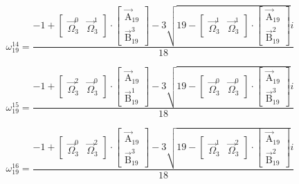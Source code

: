 \documentclass{article}
\begin{document}
\[ \omega_{19}^{14}=\frac{-1+\left[ \begin{matrix} \vec{\Omega}_{3}^{0} & \vec{\Omega}_{3}^{1} \end{matrix} \right]\cdot\left[ \begin{matrix} \vec{\mathrm{A}}_{19} \\ \vec{\mathrm{B}}_{19}^{3} \end{matrix} \right]-3\sqrt{19-\left[ \begin{matrix} \vec{\Omega}_{3}^{1} & \vec{\Omega}_{3}^{1} \end{matrix} \right]\cdot\left[ \begin{matrix} \vec{\mathrm{A}}_{19} \\ \vec{\mathrm{B}}_{19}^{2} \end{matrix} \right]}i}{18} \]

\[ \omega_{19}^{15}=\frac{-1+\left[ \begin{matrix} \vec{\Omega}_{3}^{2} & \vec{\Omega}_{3}^{0} \end{matrix} \right]\cdot\left[ \begin{matrix} \vec{\mathrm{A}}_{19} \\ \vec{\mathrm{B}}_{19}^{1} \end{matrix} \right]-3\sqrt{19-\left[ \begin{matrix} \vec{\Omega}_{3}^{0} & \vec{\Omega}_{3}^{0} \end{matrix} \right]\cdot\left[ \begin{matrix} \vec{\mathrm{A}}_{19} \\ \vec{\mathrm{B}}_{19}^{3} \end{matrix} \right]}i}{18} \]

\[ \omega_{19}^{16}=\frac{-1+\left[ \begin{matrix} \vec{\Omega}_{3}^{0} & \vec{\Omega}_{3}^{2} \end{matrix} \right]\cdot\left[ \begin{matrix} \vec{\mathrm{A}}_{19} \\ \vec{\mathrm{B}}_{19}^{3} \end{matrix} \right]-3\sqrt{19-\left[ \begin{matrix} \vec{\Omega}_{3}^{1} & \vec{\Omega}_{3}^{2} \end{matrix} \right]\cdot\left[ \begin{matrix} \vec{\mathrm{A}}_{19} \\ \vec{\mathrm{B}}_{19}^{2} \end{matrix} \right]}i}{18} \]
\end{document}
